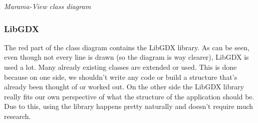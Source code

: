 \documentclass[10pt]{extarticle} %
\begin{document}
    \emph{Marama-View class diagram} \\
    \subsubsection[LibGDX]{LibGDX}
    The red part of the class diagram contains the LibGDX library.
    As can be seen, even though not every line is drawn (so the diagram is way clearer), LibGDX is used a lot.
    Many already existing classes are extended or used.
    This is done because on one side, we shouldn't write any code or build a structure that's already been thought of or worked out.
    On the other side the LibGDX library really fits our own perspective of what the structure of the application should be.
    Due to this, using the library happens pretty naturally and doesn't require much research.
\end{document}
